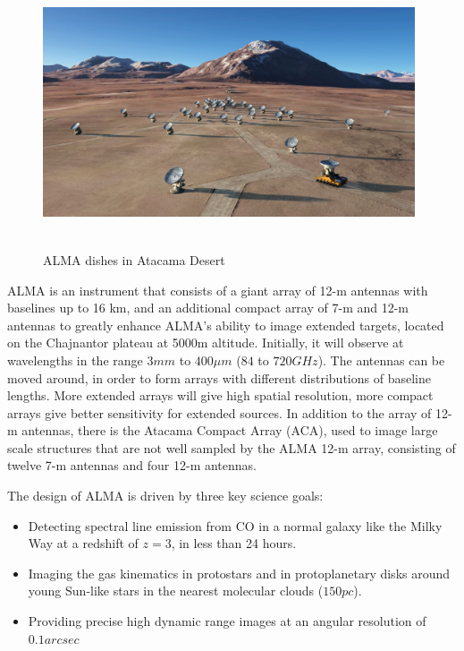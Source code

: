  \begin{figure}[H]
 \centering
 \includegraphics[width=11cm,height=8cm]{images/alma.jpg}
 \caption{ALMA dishes in Atacama Desert}
 \end{figure}


ALMA is an instrument that consists of a giant array of 12-m antennas with baselines up to 16 km, and an additional compact array of 7-m and 12-m antennas to greatly enhance ALMA's ability to image extended targets, located on the Chajnantor plateau at 5000m altitude. Initially, it will observe at wavelengths in the range $3 mm$ to $400 μm$ ($84$ to $720 GHz$). The antennas can be moved around, in order to form arrays with different distributions of baseline lengths. More extended arrays will give high spatial resolution, more compact arrays give better sensitivity for extended sources. In addition to the array of 12-m antennas, there is the Atacama Compact Array (ACA), used to image large scale structures that are not well sampled by the ALMA 12-m array, consisting of twelve 7-m antennas and four 12-m antennas. \newline

The design of ALMA is driven by three key science goals:

\begin{itemize}

\item Detecting spectral line emission from CO in a normal galaxy like the Milky Way at a redshift of $z=3$, in less than 24 hours.

\item Imaging the gas kinematics in protostars and in protoplanetary disks around young Sun-like stars in the nearest molecular clouds ($150 pc$).

\item Providing precise high dynamic range images at an angular resolution of $0.1 arcsec$
\end{itemize}

